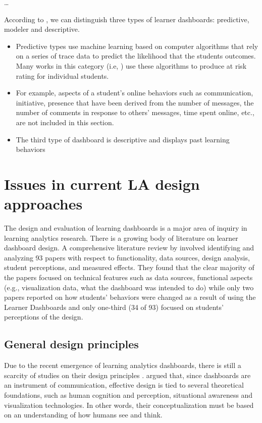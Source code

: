 \documentclass[preprint,12pt]{elsarticle}
\begin{document}
\dots


According to \citet{bennett2019four}, we can distinguish  three types of learner dashboards: predictive, modeler and descriptive. 
\begin{itemize}
    \item Predictive types use machine learning based on computer algorithms that rely on a series of trace data to predict the likelihood that the students outcomes. Many works in this category (i.e, \citep{arnold2014exercise}) use these algorithms to produce at risk rating for individual students.
    \item For example, aspects of a student's online behaviors such as communication, initiative, presence that have been derived from the number of messages, the number of comments in response to others' messages, time spent online, etc., are not included in this section. 
    \item The third type of dashboard is descriptive and displays past learning behaviors
\end{itemize}

\section{Issues in current LA design approaches}
The design and evaluation of learning dashboards is a major area of inquiry in learning analytics research.
There is a growing body of literature on learner dashboard design. A comprehensive literature review by \citet{bodily2017trends} involved identifying and analyzing 93 papers with respect to functionality, data sources, design analysis, student perceptions, and measured effects. They found that the clear majority of the papers focused on technical features such as data sources, functional aspects (e.g., visualization data, what the dashboard was intended to do) while only two papers reported on how students' behaviors were changed as a result of using the Learner Dashboards and only one-third (34 of 93) focused on students' perceptions of the design.
\subsection{General design principles}
Due to the recent emergence of learning analytics dashboards, there is still a scarcity of studies on their design principles \citep{Echeverria2018}. 
\citet{Yoo2015} argued that, since dashboards are an instrument of communication, effective design is tied to several theoretical foundations, such as human cognition and perception, situational awareness and visualization technologies. In other words, their conceptualization must be based on an understanding of how humans see and think. 
\end{document}
